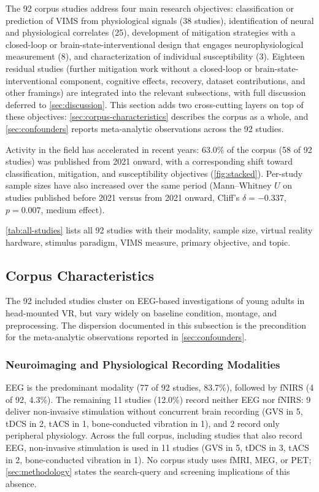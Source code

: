 The 92 corpus studies address four main research objectives: classification or prediction of VIMS from physiological signals (38 studies), identification of neural and physiological correlates (25), development of mitigation strategies with a closed-loop or brain-state-interventional design that engages neurophysiological measurement (8), and characterization of individual susceptibility (3).
Eighteen residual studies (further mitigation work without a closed-loop or brain-state-interventional component, cognitive effects, recovery, dataset contributions, and other framings) are integrated into the relevant subsections, with full discussion deferred to \autoref{sec:discussion}.
This section adds two cross-cutting layers on top of these objectives: \autoref{sec:corpus-characteristics} describes the corpus as a whole, and \autoref{sec:confounders} reports meta-analytic observations across the 92 studies.

Activity in the field has accelerated in recent years: 63.0\% of the corpus (58 of 92 studies) was published from 2021 onward, with a corresponding shift toward classification, mitigation, and susceptibility objectives (\autoref{fig:stacked}).
Per-study sample sizes have also increased over the same period (Mann--Whitney $U$ on studies published before 2021 versus from 2021 onward, Cliff's $\delta = -0.337$, $p = 0.007$, medium effect).

\autoref{tab:all-studies} lists all 92 studies with their modality, sample size, virtual reality hardware, stimulus paradigm, VIMS measure, primary objective, and topic.

\subsection{Corpus Characteristics}\label{sec:corpus-characteristics}

The 92 included studies cluster on EEG-based investigations of young adults in head-mounted VR, but vary widely on baseline condition, montage, and preprocessing.
The dispersion documented in this subsection is the precondition for the meta-analytic observations reported in \autoref{sec:confounders}.


\subsubsection{Neuroimaging and Physiological Recording Modalities}
\enlargethispage{\baselineskip}
EEG is the predominant modality (77 of 92 studies, 83.7\%), followed by fNIRS (4 of 92, 4.3\%).
The remaining 11 studies (12.0\%) record neither EEG nor fNIRS: 9 deliver non-invasive stimulation without concurrent brain recording (GVS in 5, tDCS in 2, tACS in 1, bone-conducted vibration in 1), and 2 record only peripheral physiology.
Across the full corpus, including studies that also record EEG, non-invasive stimulation is used in 11 studies (GVS in 5, tDCS in 3, tACS in 2, bone-conducted vibration in 1).
No corpus study uses fMRI, MEG, or PET; \autoref{sec:methodology} states the search-query and screening implications of this absence.


